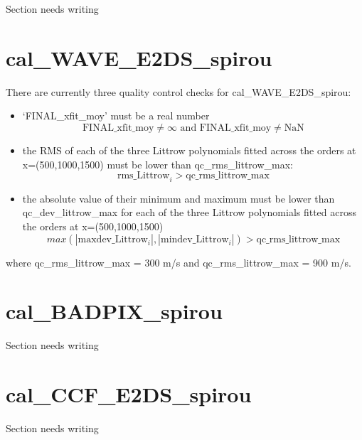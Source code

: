 Section needs writing

\section{cal\_WAVE\_E2DS\_spirou}
\label{section:qc_cal_WAVE_E2DS_spirou}

There are currently three quality control checks for cal\_WAVE\_E2DS\_spirou:

\begin{itemize}
\item `FINAL\_xfit\_moy' must be a real number
	\begin{equation}
	\text{FINAL\_xfit\_moy} \neq \infty \text{ and }
	\text{FINAL\_xfit\_moy} \neq \text{NaN}
	\end{equation}
\item the RMS of each of the three Littrow polynomials fitted across the orders at x=(500,1000,1500) must be lower than qc\_rms\_littrow\_max: 
	\begin{equation}
	\text{rms\_Littrow}_i > \text{qc\_rms\_littrow\_max}
	\end{equation}
\item the absolute value of their minimum and maximum must be lower than qc\_dev\_littrow\_max for each of the three Littrow polynomials fitted across the orders at x=(500,1000,1500)
	\begin{equation}
	max(|\text{maxdev\_Littrow}_i|, |\text{mindev\_Littrow}_i|) > \text{qc\_rms\_littrow\_max}
	\end{equation}
\end{itemize}

\noindent where qc\_rms\_littrow\_max = 300 m/s and qc\_rms\_littrow\_max = 900 m/s.


\section{cal\_BADPIX\_spirou}
\label{section:qc_cal_BADPIX_spirou}

Section needs writing

\section{cal\_CCF\_E2DS\_spirou}
\label{section:qc_cal_CCF_E2DS_spirou}

Section needs writing


